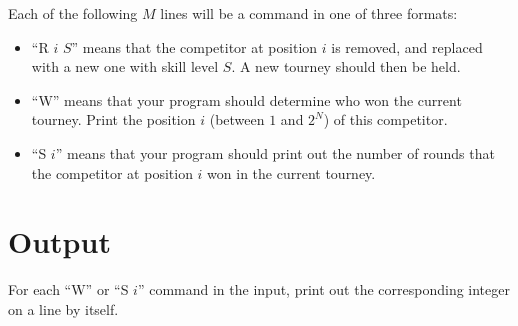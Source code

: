 Each of the following $M$ lines will be a command in one of three formats:

\begin{itemize}
    \item ``R $i$ $S$'' means that the competitor at position $i$ is removed, and replaced with a new one with skill level $S$. A new tourney should then be held.
    \item ``W'' means that your program should determine who won the current tourney. Print the position $i$ (between $1$ and $2^N$) of this competitor.
    \item ``S $i$'' means that your program should print out the number of rounds that the competitor at position $i$ won in the current tourney.
\end{itemize}

\section*{Output}
For each ``W'' or ``S $i$'' command in the input, print out the corresponding integer on a line by itself.
